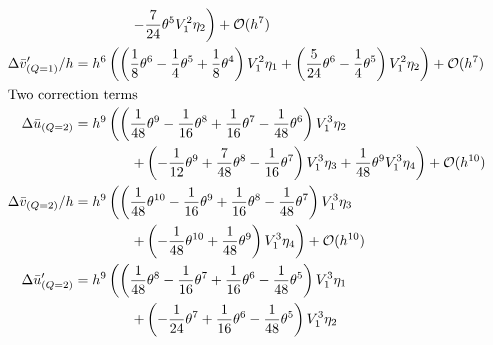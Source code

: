 \begin{align*}
                            & \qquad\qquad \left. -\frac{7}{24} \theta^{5} V_{1}^{2} \eta_{2}\right) + \mathcal{O}(h^{7})                                                                                                                                              \\
  \Delta \bar{v}'_{(Q=1)}/h & = h^{6}\left(\left(\frac{1}{8} \theta^{6} - \frac{1}{4} \theta^{5} + \frac{1}{8} \theta^{4}\right) V_{1}^{2} \eta_{1} + \left(\frac{5}{24} \theta^{6} - \frac{1}{4} \theta^{5}\right) V_{1}^{2} \eta_{2}\right) + \mathcal{O}(h^{7})     \\
  \intertext{Two correction terms}
  \Delta \bar{u}_{(Q=2)}    & = h^{9}\left(\left(\frac{1}{48} \theta^{9} - \frac{1}{16} \theta^{8} + \frac{1}{16} \theta^{7} - \frac{1}{48} \theta^{6}\right) V_{1}^{3} \eta_{2} \right.                                                                               \\
                            & \qquad\qquad \left.
  + \left(-\frac{1}{12} \theta^{9} + \frac{7}{48} \theta^{8} - \frac{1}{16} \theta^{7}\right) V_{1}^{3} \eta_{3} 											%
  +\frac{1}{48} \theta^{9} V_{1}^{3} \eta_{4}\right) + \mathcal{O}(h^{10})                                                                                                                                                                                             \\
  \Delta \bar{v}_{(Q=2)}/h  & = h^{9}\left(\left(\frac{1}{48} \theta^{10} - \frac{1}{16} \theta^{9} + \frac{1}{16} \theta^{8} - \frac{1}{48} \theta^{7}\right) V_{1}^{3} \eta_{3} \right.                                                                              \\
                            & \qquad\qquad \left. + \left(-\frac{1}{48} \theta^{10} + \frac{1}{48} \theta^{9}\right) V_{1}^{3} \eta_{4}\right) + \mathcal{O}(h^{10})                                                                                                   \\
  \Delta \bar{u}'_{(Q=2)}   & = h^{9}\left(\left(\frac{1}{48} \theta^{8} - \frac{1}{16} \theta^{7} + \frac{1}{16} \theta^{6} - \frac{1}{48} \theta^{5}\right) V_{1}^{3} \eta_{1} \right.                                                                               \\
                            & \qquad\qquad \left. + \left(-\frac{1}{24} \theta^{7} + \frac{1}{16} \theta^{6} - \frac{1}{48} \theta^{5}\right) V_{1}^{3} \eta_{2} \right.                                                                                               \\

\end{align*}
